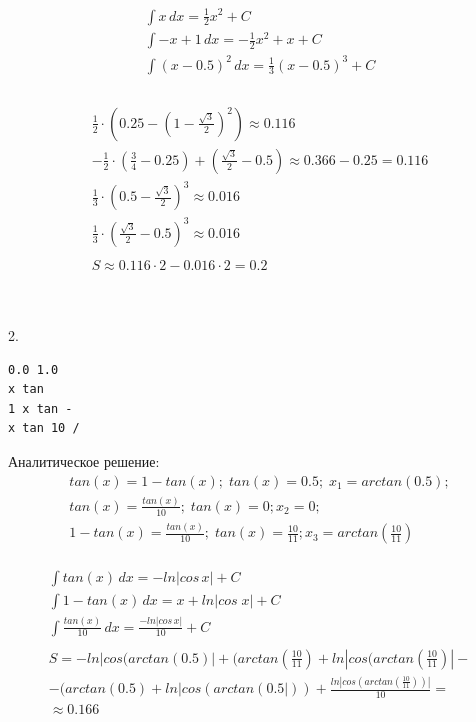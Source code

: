 \documentclass[a4paper,12pt,titlepage,finall]{article}
\begin{document}
$$
\begin{gathered}
\int x\,dx = \frac{1}{2} x^2 + C\\
\int -x+1\,dx = -\frac{1}{2}x^2+x + C\\
\int (x-0.5)^2\,dx = \frac{1}{3}(x-0.5)^3 + C\\\\
\end{gathered}
$$

$$
\begin{gathered}
\frac{1}{2}\cdot(0.25 - (1 - \frac{\sqrt{3}}{2})^2) \approx 0.116\\
-\frac{1}{2}\cdot(\frac{3}{4} - 0.25) + (\frac{\sqrt{3}}{2} - 0.5) \approx 0.366 - 0.25 = 0.116\\
\frac{1}{3}\cdot (0.5 - \frac{\sqrt{3}}{2})^3 \approx 0.016\\
\frac{1}{3}\cdot (\frac{\sqrt{3}}{2}-0.5)^3 \approx 0.016\\\\
S \approx 0.116 \cdot 2 - 0.016 \cdot 2 = 0.2
\end{gathered}
$$
\\\\


\newpage


2.
\begin{verbatim}
0.0 1.0
x tan
1 x tan -
x tan 10 /
\end{verbatim}
Аналитическое решение:
$$
\begin{gathered}
tan(x) = 1 - tan(x);\;tan(x) = 0.5;\; x_1 = arctan(0.5);\\
tan(x) = \frac{tan(x)}{10};\;tan(x) = 0; x_2 = 0;\\
1 - tan(x) = \frac{tan(x)}{10};\;tan(x)=\frac{10}{11}; x_3 = arctan(\frac{10}{11})\\
\end{gathered}
$$

$$
\begin{gathered}
\int tan(x)\,dx = -ln|cos\,x| + C\\
\int 1 - tan(x)\,dx = x + ln|cos\;x|+C\\
\int \frac{tan(x)}{10}\,dx = \frac{-ln|cos\,x|}{10} + C\\\\
S = -ln|cos(arctan(0.5)| + (arctan(\frac{10}{11}) + ln|cos(arctan(\frac{10}{11})| - \\- (arctan(0.5)+ln|cos(arctan(0.5|)) + \frac{ln|cos(arctan(\frac{10}{11}))|}{10} = \\
\approx 0.166
\end{gathered}
$$
\end{document}
